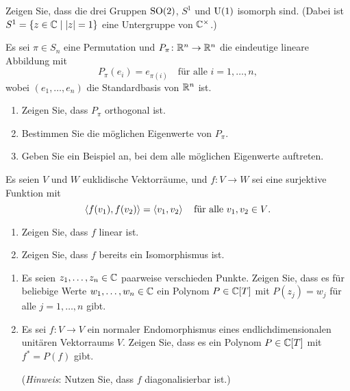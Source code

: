 \begin{question}[subtitle = Rotationsgruppen]{3}
  Zeigen Sie, dass die drei Gruppen $\operatorname{SO}(2)$, $S^1$ und $\operatorname{U}(1)$ isomorph sind.
  (Dabei ist $S^1 = \{z \in \mathbb{C} \mid |z| = 1\}$ eine Untergruppe von $\mathbb{C}^\times$.)
\end{question}


\begin{question}[subtitle = Permutationsmatrizen sind orthogonal]{3}
  Es sei $\pi \in S_n$ eine Permutation und $P_\pi \colon \mathbb{R}^n \to \mathbb{R}^n$ die eindeutige lineare Abbildung mit
  \[
    P_\pi(e_i) = e_{\pi(i)}
    \quad
    \text{für alle $i = 1, \dotsc, n$},
  \]
  wobei $(e_1, \dotsc, e_n)$ die Standardbasis von $\mathbb{R}^n$ ist.
  \begin{enumerate}[leftmargin=*]
    \item
      Zeigen Sie, dass $P_\pi$ orthogonal ist.
    \item
      Bestimmen Sie die möglichen Eigenwerte von $P_\pi$.
    \item
      Geben Sie ein Beispiel an, bei dem alle möglichen Eigenwerte auftreten.
  \end{enumerate}
\end{question}


\begin{question}[subtitle = Linearität orthogonaler Abbildungen]{3}
  Es seien $V$ und $W$ euklidische Vektorräume, und $f \colon V \to W$ sei eine surjektive Funktion mit
  \[
    \left\langle f(v_1), f(v_2) \right\rangle = \left\langle v_1, v_2 \right\rangle
    \quad
    \text{für alle $v_1, v_2 \in V$}.
  \]
  \begin{enumerate}[leftmargin=*]
    \item
      Zeigen Sie, dass $f$ linear ist.
    \item
      Zeigen Sie, dass $f$ bereits ein Isomorphismus ist.
  \end{enumerate}
\end{question}


\begin{question}[subtitle = Die Adjungierte Abbildung als Polynom]{3}
  \begin{enumerate}[leftmargin=*]
    \item
      Es seien $z_1, \dotsc, z_n \in \mathbb{C}$ paarweise verschieden Punkte.
      Zeigen Sie, dass es für beliebige Werte $w_1, \dotsc, w_n \in \mathbb{C}$ ein Polynom $P \in \mathbb{C}[T]$ mit $P(z_j) = w_j$ für alle $j = 1, \dotsc, n$ gibt.
    \item
      Es sei $f \colon V \to V$ ein normaler Endomorphismus eines endlichdimensionalen unitären Vektorraums $V$.
      Zeigen Sie, dass es ein Polynom $P \in \mathbb{C}[T]$ mit $f^* = P(f)$ gibt.
      
      (\emph{Hinweis}:
       Nutzen Sie, dass $f$ diagonalisierbar ist.)
  \end{enumerate}
\end{question}





